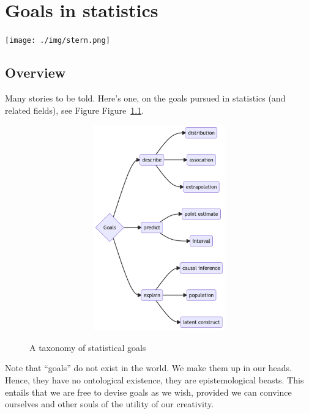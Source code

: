 \documentclass[
  letterpaper,
  DIV=11,
  numbers=noendperiod]{scrreprt}
\theoremstyle{definition}
\theoremstyle{definition}
\theoremstyle{remark}
\begin{document}

\hypertarget{goals-in-statistics}{%
\chapter{Goals in statistics}\label{goals-in-statistics}}

\texttt{[image: ./img/stern.png]}

\hypertarget{overview}{%
\section{Overview}\label{overview}}

Many stories to be told. Here's one, on the goals pursued in statistics
(and related fields), see Figure Figure~\ref{fig-goals}.

\begin{figure}

{\centering 

\begin{figure}[H]

{\centering \includegraphics[width=5.5in,height=3.5in]{./goals_files/figure-latex/mermaid-figure-1.png}

}

\end{figure}

}

\caption{\label{fig-goals}A taxonomy of statistical goals}

\end{figure}

\begin{tcolorbox}[enhanced jigsaw, bottomrule=.15mm, toprule=.15mm, coltitle=black, breakable, title=\textcolor{quarto-callout-note-color}{\faInfo}\hspace{0.5em}{Note}, leftrule=.75mm, colback=white, bottomtitle=1mm, toptitle=1mm, left=2mm, opacityback=0, titlerule=0mm, colbacktitle=quarto-callout-note-color!10!white, opacitybacktitle=0.6, colframe=quarto-callout-note-color-frame, rightrule=.15mm, arc=.35mm]
Note that ``goals'' do not exist in the world. We make them up in our
heads. Hence, they have no ontological existence, they are
epistemological beasts. This entails that we are free to devise goals as
we wish, provided we can convince ourselves and other souls of the
utility of our creativity.
\end{tcolorbox}
\end{document}
